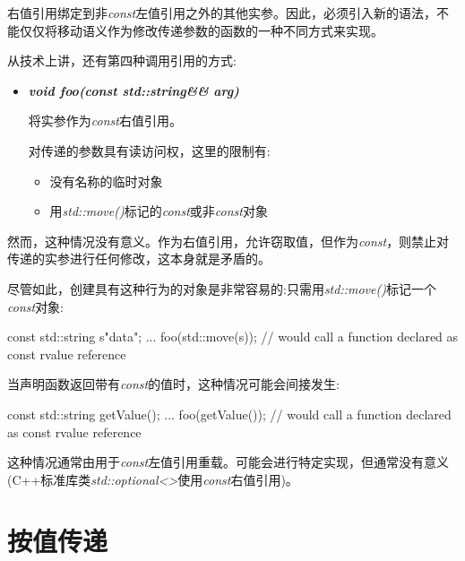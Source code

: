 右值引用绑定到非\textit{const}左值引用之外的其他实参。因此，必须引入新的语法，不能仅仅将移动语义作为修改传递参数的函数的一种不同方式来实现。\par


从技术上讲，还有第四种调用引用的方式:\par

\begin{itemize}
  \item \textit{\textbf{void foo(\allowbreak{}const std::\allowbreak{}string\&\& arg)\allowbreak{}}}\par
  将实参作为\textit{const}右值引用。\par
  对传递的参数具有读访问权，这里的限制有:
  \begin{itemize}
    \item[-] 没有名称的临时对象
    \item[-] 用\textit{std::move()}标记的\textit{const}或非\textit{const}对象
  \end{itemize}
\end{itemize}

然而，这种情况没有意义。作为右值引用，允许窃取值，但作为\textit{const}，则禁止对传递的实参进行任何修改，这本身就是矛盾的。\par

尽管如此，创建具有这种行为的对象是非常容易的:只需用\textit{std::move()}标记一个\textit{const}对象:\par

\begin{codebox}[cpp]
const std::string s{"data"};
...
foo(std::move(s)); // would call a function declared as const rvalue reference
\end{codebox}

当声明函数返回带有\textit{const}的值时，这种情况可能会间接发生:\par

\begin{codebox}[cpp]
const std::string getValue();
...
foo(getValue()); // would call a function declared as const rvalue reference
\end{codebox}

这种情况通常由用于\textit{const}左值引用重载。可能会进行特定实现，但通常没有意义(C++标准库类\textit{std::\allowbreak{}optional<\allowbreak{}>}使用\textit{const}右值引用)。\par


\section{按值传递}


